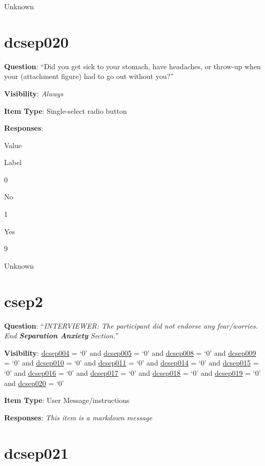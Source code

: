 \documentclass[]{book}
\begin{document}
Unknown

\hypertarget{dcsep020}{%
\section{dcsep020}\label{dcsep020}}

\textbf{Question}: ``Did you get sick to your stomach, have headaches, or throw-up when your (attachment figure) had to go out without you?''

\textbf{Visibility}: \emph{Always}

\textbf{Item Type}: Single-select radio button

\textbf{Responses}:

Value

Label

0

No

1

Yes

9

Unknown

\hypertarget{csep2}{%
\section{csep2}\label{csep2}}

\textbf{Question}: ``\emph{INTERVIEWER: The participant did not endorse any fear/worries. End \textbf{Separation Anxiety} Section.}''

\textbf{Visibility}: \protect\hyperlink{dcsep004}{dcsep004} = `0' and \protect\hyperlink{dcsep005}{dcsep005} = `0' and \protect\hyperlink{dcsep008}{dcsep008} = `0' and \protect\hyperlink{dcsep009}{dcsep009} = `0' and \protect\hyperlink{dcsep010}{dcsep010} = `0' and \protect\hyperlink{dcsep011}{dcsep011} = `0' and \protect\hyperlink{dcsep014}{dcsep014} = `0' and \protect\hyperlink{dcsep015}{dcsep015} = `0' and \protect\hyperlink{dcsep016}{dcsep016} = `0' and \protect\hyperlink{dcsep017}{dcsep017} = `0' and \protect\hyperlink{dcsep018}{dcsep018} = `0' and \protect\hyperlink{dcsep019}{dcsep019} = `0' and \protect\hyperlink{dcsep020}{dcsep020} = `0'

\textbf{Item Type}: User Message/instructions

\textbf{Responses}: \emph{This item is a markdown message}

\hypertarget{dcsep021}{%
\section{dcsep021}\label{dcsep021}}
\end{document}
